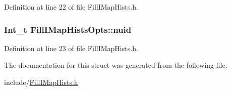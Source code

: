 Definition at line 22 of file Fill\-I\-Map\-Hists.\-h.

\hypertarget{struct_fill_i_map_hists_opts_a92318ccda191568649f09f2220dd8371}{
\subsubsection[{nuid}]{\setlength{\rightskip}{0pt plus 5cm}Int\-\_\-t Fill\-I\-Map\-Hists\-Opts\-::nuid}}\label{struct_fill_i_map_hists_opts_a92318ccda191568649f09f2220dd8371}


Definition at line 23 of file Fill\-I\-Map\-Hists.\-h.



The documentation for this struct was generated from the following file\-:\begin{DoxyCompactItemize}
\item 
include/\hyperlink{_fill_i_map_hists_8h}{Fill\-I\-Map\-Hists.\-h}\end{DoxyCompactItemize}
